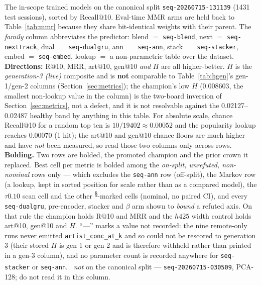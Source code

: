 \documentclass[11pt]{article}
\newcommand{\dsid}[1]{\texttt{\small #1}}
\begin{document}
\begin{table}[ht]
  \centering
  \caption{The in-scope trained models on the canonical split
    \dsid{seq-20260715-131139} (\num{1431} test sessions), sorted by Recall@10.
    Eval-time MMR arms are held back to Table~\ref{tab:mmr} because they share
    bit-identical weights with their parent. The \emph{family} column abbreviates
    the predictor: blend $=$ \texttt{seq-blend}, next $=$ \texttt{seq-nexttrack},
    dual $=$ \texttt{seq-dualgru}, ann $=$ \texttt{seq-ann}, stack $=$
    \texttt{seq-stacker}, embed $=$ \texttt{seq-embed}, lookup $=$ a
    non-parametric table over the dataset. \textbf{Directions:} R@10, MRR,
    art@10, gen@10 \emph{and} $H$ are all higher-better. $H$ is the
    \emph{generation-3 (live)} composite and is \textbf{not} comparable to
    Table~\ref{tab:hgen}'s gen-1/gen-2 columns (Section~\ref{sec:metrics}); the
    champion's low $H$ (\num{0.008603}, the smallest non-lookup value in the
    column) is the two-board inversion of Section~\ref{sec:metrics}, not a
    defect, and it is not resolvable against the \numrange{0.02127}{0.02487}
    healthy band by anything in this table. For absolute scale, chance Recall@10
    for a random top ten is $10/\num{19402}\approx\num{0.00052}$ and the
    popularity lookup reaches \num{0.00070} (\num{1} hit); the art@10 and gen@10
    chance floors are much higher and have \emph{not} been measured, so read
    those two columns only across rows.
    \textbf{Bolding.} Two rows are bolded, the promoted champion and the prior
    crown it replaced. Best cell per metric is bolded among the
    \emph{on-split, unrefuted, non-nominal} rows only --- which excludes the
    \texttt{seq-ann} row (off-split), the Markov row (a lookup, kept in sorted
    position for scale rather than as a compared model), the $\tau0.10$ scan cell
    and the other \textsuperscript{\S}-marked cells (nominal, no paired CI), and
    every \texttt{seq-dualgru}, pre-encoder, stacker and $\beta$ arm shown to
    \emph{bound} a refuted axis. On that rule the champion holds R@10 and MRR and
    the $h425$ width control holds art@10, gen@10 and $H$.
    ``---'' marks a value not recorded: the nine remote-only runs never emitted
    \texttt{artist\_conc\_at\_k} and so could not be rescored to generation 3
    (their stored $H$ is gen 1 or gen 2 and is therefore withheld rather than
    printed in a gen-3 column), and no parameter count is recorded anywhere for
    \texttt{seq-stacker} or \texttt{seq-ann}.
    \textsuperscript{\dag}~\emph{not} on the canonical split ---
    \dsid{seq-20260715-030509}, PCA-128; do not read it in this column.
}
\end{table}
\end{document}
